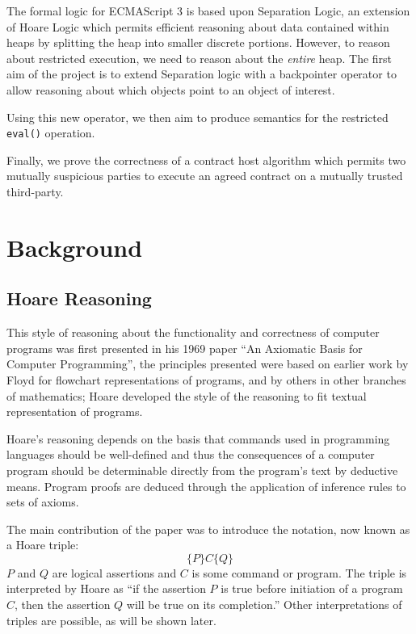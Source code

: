\documentclass[a4paper]{report}
\begin{document}
  The formal logic for ECMAScript 3 is based upon Separation Logic, an extension
  of Hoare Logic which permits efficient reasoning about data contained within
  heaps by splitting the heap into smaller discrete portions. However, to reason
  about restricted execution, we need to reason about the \emph{entire}
  heap. The first aim of the project is to extend Separation logic with a
  backpointer operator to allow reasoning about which objects point to an
  object of interest.

  Using this new operator, we then aim to produce semantics for the restricted
  \texttt{eval()} operation.

  Finally, we prove the correctness of a contract host algorithm
  \cite{contract-host-algo} which permits
  two mutually suspicious parties to execute an agreed contract on a mutually
  trusted third-party.




\chapter{Background}
\section{Hoare Reasoning}
  This style of reasoning about the functionality and correctness of computer
  programs was first presented in his 1969 paper ``An Axiomatic Basis for
  Computer Programming''\cite{Hoare1969Axiom}, the principles presented were
  based on earlier work by Floyd\cite{floyd1967assigning} for flowchart
  representations of programs, and by others in other branches of mathematics;
  Hoare developed the style of the reasoning to fit textual representation of
  programs.

  Hoare's reasoning depends on the basis that commands used in programming
  languages should be well-defined and thus the consequences of a computer
  program should be determinable directly from the program's text by deductive
  means. Program proofs are deduced through the application of inference rules
  to sets of axioms.

  The main contribution of the paper was to introduce the notation, now known as
  a Hoare triple:
    \[ \{P\} C \{Q\} \]
  $P$ and $Q$ are logical assertions and $C$ is some command or program. The
  triple is interpreted by Hoare as ``if the assertion $P$ is true before
  initiation of a program $C$, then the assertion $Q$ will be true on its
  completion.'' Other interpretations of triples are possible, as will be shown
  later.
\end{document}
